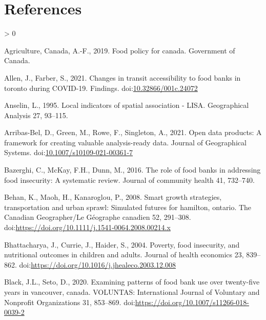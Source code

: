 \documentclass[]{elsarticle} %
\newlength{\cslhangindent}
\newenvironment{CSLReferences}[2] %
 {%
  \setlength{\parindent}{0pt}
  \ifodd #1 \everypar{\setlength{\hangindent}{\cslhangindent}}\ignorespaces\fi
  \ifnum #2 > 0
  \setlength{\parskip}{#2\baselineskip}
  \fi
 }%
 {}
\begin{document}
\hypertarget{references}{%
\section*{References}\label{references}}

\hypertarget{refs}{}
\begin{CSLReferences}{1}{0}
\leavevmode\hypertarget{ref-foodpolicy2019}{}%
Agriculture, Canada, A.-F., 2019. Food policy for canada. Government of
Canada.

\leavevmode\hypertarget{ref-allen2021Changes}{}%
Allen, J., Farber, S., 2021. Changes in transit accessibility to food
banks in toronto during COVID-19. Findings.
doi:\href{https://doi.org/10.32866/001c.24072}{10.32866/001c.24072}

\leavevmode\hypertarget{ref-anselin1995local}{}%
Anselin, L., 1995. Local indicators of spatial association - LISA.
Geographical Analysis 27, 93--115.

\leavevmode\hypertarget{ref-arribas2021open}{}%
Arribas-Bel, D., Green, M., Rowe, F., Singleton, A., 2021. Open data
products: A framework for creating valuable analysis-ready data. Journal
of Geographical Systems.
doi:\href{https://doi.org/10.1007/s10109-021-00361-7}{10.1007/s10109-021-00361-7}

\leavevmode\hypertarget{ref-bazerghi2016role}{}%
Bazerghi, C., McKay, F.H., Dunn, M., 2016. The role of food banks in
addressing food insecurity: A systematic review. Journal of community
health 41, 732--740.

\leavevmode\hypertarget{ref-behan2008smart}{}%
Behan, K., Maoh, H., Kanaroglou, P., 2008. Smart growth strategies,
transportation and urban sprawl: Simulated futures for hamilton,
ontario. The Canadian Geographer/Le G{é}ographe canadien 52, 291--308.
doi:\url{https://doi.org/10.1111/j.1541-0064.2008.00214.x}

\leavevmode\hypertarget{ref-bhattacharya2004poverty}{}%
Bhattacharya, J., Currie, J., Haider, S., 2004. Poverty, food
insecurity, and nutritional outcomes in children and adults. Journal of
health economics 23, 839--862.
doi:\url{https://doi.org/10.1016/j.jhealeco.2003.12.008}

\leavevmode\hypertarget{ref-black2020examining}{}%
Black, J.L., Seto, D., 2020. Examining patterns of food bank use over
twenty-five years in vancouver, canada. VOLUNTAS: International Journal
of Voluntary and Nonprofit Organizations 31, 853--869.
doi:\url{https://doi.org/10.1007/s11266-018-0039-2}


\end{CSLReferences}
\end{document}
